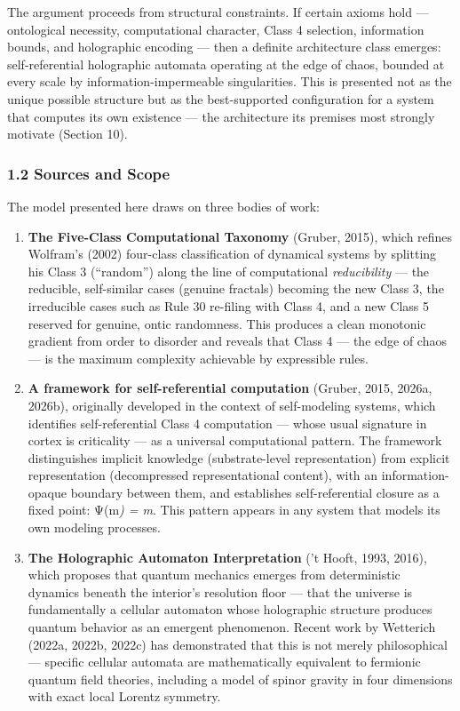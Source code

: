 \documentclass[
]{article}
\begin{document}
The argument proceeds from structural constraints. If certain axioms
hold --- ontological necessity, computational character, Class 4
selection, information bounds, and holographic encoding --- then a
definite architecture class emerges: self-referential holographic
automata operating at the edge of chaos, bounded at every scale by
information-impermeable singularities. This is presented not as the
unique possible structure but as the best-supported configuration for a
system that computes its own existence --- the architecture its premises
most strongly motivate (Section 10).

\hypertarget{sources-and-scope}{%
\subsubsection{1.2 Sources and Scope}\label{sources-and-scope}}

The model presented here draws on three bodies of work:

\begin{enumerate}
\def\labelenumi{\arabic{enumi}.}
\item
  \textbf{The Five-Class Computational Taxonomy} (Gruber, 2015), which
  refines Wolfram's (2002) four-class classification of dynamical
  systems by splitting his Class 3 (``random'') along the line of
  computational \emph{reducibility} --- the reducible, self-similar
  cases (genuine fractals) becoming the new Class 3, the irreducible
  cases such as Rule 30 re-filing with Class 4, and a new Class 5
  reserved for genuine, ontic randomness. This produces a clean
  monotonic gradient from order to disorder and reveals that Class 4 ---
  the edge of chaos --- is the maximum complexity achievable by
  expressible rules.
\item
  \textbf{A framework for self-referential computation} (Gruber, 2015,
  2026a, 2026b), originally developed in the context of self-modeling
  systems, which identifies self-referential Class 4 computation ---
  whose usual signature in cortex is criticality --- as a universal
  computational pattern. The framework distinguishes implicit knowledge
  (substrate-level representation) from explicit representation
  (decompressed representational content), with an information-opaque
  boundary between them, and establishes self-referential closure as a
  fixed point: Ψ(m\emph{) = m}. This pattern appears in any system that
  models its own modeling processes.
\item
  \textbf{The Holographic Automaton Interpretation} ('t Hooft, 1993,
  2016), which proposes that quantum mechanics emerges from
  deterministic dynamics beneath the interior's resolution floor ---
  that the universe is fundamentally a cellular automaton whose
  holographic structure produces quantum behavior as an emergent
  phenomenon. Recent work by Wetterich (2022a, 2022b, 2022c) has
  demonstrated that this is not merely philosophical --- specific
  cellular automata are mathematically equivalent to fermionic quantum
  field theories, including a model of spinor gravity in four dimensions
  with exact local Lorentz symmetry.
\end{enumerate}
\end{document}
